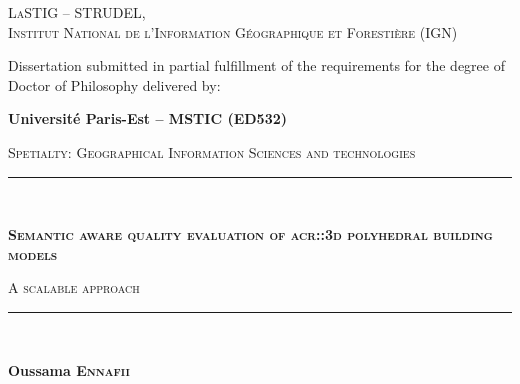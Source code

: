 \begin{titlepage}
    \begin{center}
        

        \vspace*{10mm}

        \begin{minipage}{.5\textwidth}
            \centering
            \textsc{LaSTIG -- STRUDEL,\\ Institut National de l'Information Géographique et Forestière (IGN)}
        \end{minipage}

        \vfill

        Dissertation submitted in partial fulfillment of the requirements for the degree of Doctor of Philosophy delivered by:

        \vspace*{5mm}

        \begin{Large}
            \textbf{Université Paris-Est -- MSTIC (ED532)}
        \end{Large}

        \vspace*{10mm}
        \begin{large}
            \textsc{Spetialty: Geographical Information Sciences and technologies}
        \end{large}
        \vspace*{10mm}

        \rule{\textwidth}{1.5pt}\\
        \begin{LARGE}
            \textsc{\textbf{Semantic aware quality evaluation of \acrshort*{acr::3d} polyhedral building models}}\\
        \end{LARGE}
        \vspace*{2.5mm}
        \begin{Large}
            \textsc{A scalable approach}
        \end{Large}
        \rule{\textwidth}{1.5pt}\\

        \vspace*{10mm}

        \begin{large}
            \textbf{Oussama \textsc{Ennafii}}
        \end{large}


\end{center}
\end{titlepage}
